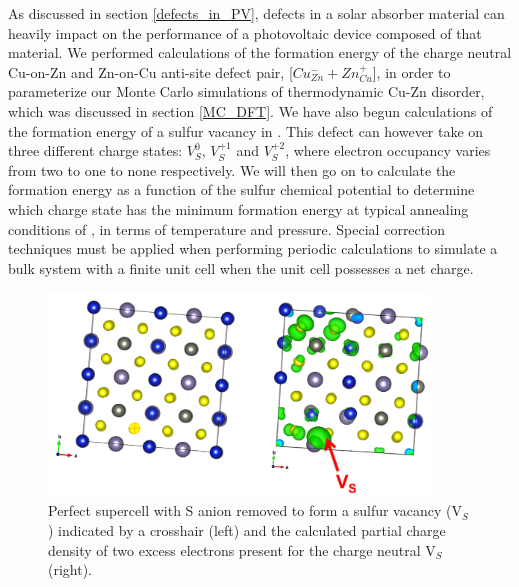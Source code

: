 As discussed in section \ref{defects_in_PV}, defects in a solar absorber material can heavily impact on the performance of a photovoltaic device composed of that material. We performed calculations of the formation energy of the charge neutral Cu-on-Zn and Zn-on-Cu anti-site defect pair, [$Cu_{Zn}^- + Zn_{Cu}^+$], in order to parameterize our Monte Carlo simulations of thermodynamic Cu-Zn disorder, which was discussed in section \ref{MC_DFT}. We have also begun calculations of the formation energy of a sulfur vacancy in { \CZTS }. This defect can however take on three different charge states: $V_{S}^{0}$, $V_{S}^{+1}$ and $V_{S}^{+2}$, where electron occupancy varies from two to one to none respectively. We will then go on to calculate the formation energy as a function of the sulfur chemical potential to determine which charge state has the minimum formation energy at typical annealing conditions of { \CZTS }, in terms of temperature and pressure. Special correction techniques must be applied when performing periodic calculations to simulate a bulk system with a finite unit cell when the unit cell possesses a net charge. \\

\begin{figure}[h!]
  \centering
    \includegraphics[width=0.9\textwidth]{figures/V_S-neutral-PARCHG.png}
    \caption{Perfect {\CZTS } supercell with S anion removed to form a sulfur vacancy (V$_S$) indicated by a crosshair (left) and the calculated partial charge density of two excess electrons present for the charge neutral V$_S$ (right).}
  \label{V_S-neutral-PARCHG}
\end{figure}

